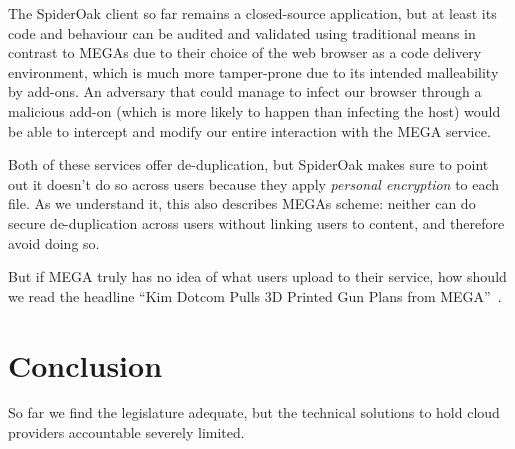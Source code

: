 \documentclass[11pt]{article}
\begin{document}
The SpiderOak client so far remains a closed-source application, but at least its code and behaviour can be audited and validated using traditional means in contrast to MEGAs due to their choice of the web browser as a code delivery environment, which is much more tamper-prone due to its intended malleability by add-ons.
An adversary that could manage to infect our browser through a malicious add-on (which is more likely to happen than infecting the host) would be able to intercept and modify our entire interaction with the MEGA service.

Both of these services offer de-duplication, but SpiderOak makes sure to point out it doesn't do so across users because they apply \textit{personal encryption} to each file.
As we understand it, this also describes MEGAs scheme: neither can do secure de-duplication across users without linking users to content, and therefore avoid doing so.

But if MEGA truly has no idea of what users upload to their service, how should we read the headline ``Kim Dotcom Pulls 3D Printed Gun Plans from MEGA''~\cite{3d_gun}.


\section{Conclusion}
So far we find the legislature adequate, but the technical solutions to hold cloud providers accountable severely limited.


{}

\end{document}
